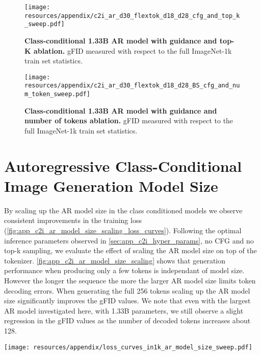 \begin{figure}[h]
\centering
\texttt{[image: resources/appendix/c2i\_ar\_d30\_flextok\_d18\_d28\_cfg\_and\_top\_k\_sweep.pdf]}
\caption{
\textbf{Class-conditional 1.33B AR model with \oursxlarge guidance and top-K ablation.}
gFID measured with respect to the full ImageNet-1k train set statistics. 
}
\label{fig:app_c2i_d30_cfg_and_top_k_sweep}
\end{figure}

\begin{figure}[h]
\centering
\texttt{[image: resources/appendix/c2i\_ar\_d30\_flextok\_d18\_d28\_BS\_cfg\_and\_num\_token\_sweep.pdf]}
\caption{
\textbf{Class-conditional 1.33B AR model with \oursxlarge guidance and number of tokens ablation.}
gFID measured with respect to the full ImageNet-1k train set statistics. 
}
\label{fig:app_c2i_d30_cfg_and_num_tokens_sweep}
\end{figure}

 
\clearpage
\section{Autoregressive Class-Conditional Image Generation Model Size}
\label{sec:app_c2i_model_size}

By scaling up the AR model size in the class conditioned models we observe consistent improvements in the training loss (\cref{fig:app_c2i_ar_model_size_scaling_loss_curves}). Following the optimal inference parameters observed in \cref{sec:app_c2i_hyper_params}, no CFG and no top-k sampling, we evaluate the effect of scaling the AR model size on top of the \oursxlarge tokenizer. \cref{fig:app_c2i_ar_model_size_scaling} shows that generation performance when producing only a few tokens is independant of model size. However the longer the sequence the more the larger AR model size limits token decoding errors. When generating the full 256 tokens scaling up the AR model size significantly improves the gFID values. We note that even with the largest AR model investigated here, with 1.33B parameters, we still observe a slight regression in the gFID values as the number of decoded tokens increases about 128.


\begin{figure*}[h]
\centering
\texttt{[image: resources/appendix/loss\_curves\_in1k\_ar\_model\_size\_sweep.pdf]}
\caption{
\textbf{Autoregressive class-conditional image generation loss curves.} The AR models of different sizes shown here are trained for 94B tokens on ImageNet-1k using the \oursxlarge tokenizer trained on ImageNet-1k.
}
\label{fig:app_c2i_ar_model_size_scaling_loss_curves}
\end{figure*}

